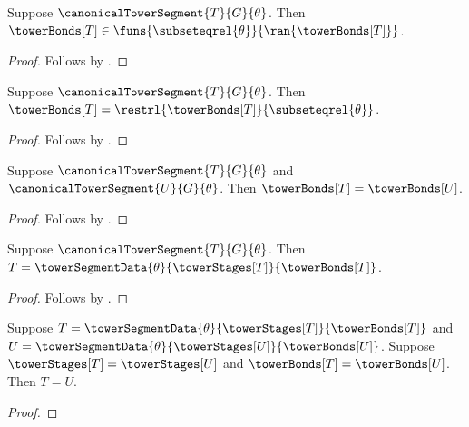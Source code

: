 \begin{proposition}\label{canonical_tower_bond_family_type}
    Suppose $\canonicalTowerSegment{T}{G}{\theta}$.
    Then $\towerBonds[T]\in
        \funs{\subseteqrel{\theta}}{\ran{\towerBonds[T]}}$.
\end{proposition}
\begin{proof}
    Follows by
        .
\end{proof}

\begin{proposition}\label{canonical_tower_bond_full_restriction}
    Suppose $\canonicalTowerSegment{T}{G}{\theta}$.
    Then $\towerBonds[T]=
        \restrl{\towerBonds[T]}{\subseteqrel{\theta}}$.
\end{proposition}
\begin{proof}
    Follows by
        .
\end{proof}

\begin{theorem}\label{canonical_tower_bond_families_equal}
    Suppose $\canonicalTowerSegment{T}{G}{\theta}$ and
        $\canonicalTowerSegment{U}{G}{\theta}$.
    Then $\towerBonds[T]=\towerBonds[U]$.
\end{theorem}
\begin{proof}
    Follows by
        .
\end{proof}

\begin{proposition}\label{canonical_tower_segment_constructor_identity}
    Suppose $\canonicalTowerSegment{T}{G}{\theta}$.
    Then $T=\towerSegmentData{\theta}
        {\towerStages[T]}{\towerBonds[T]}$.
\end{proposition}
\begin{proof}
    Follows by
        .
\end{proof}

\begin{proposition}\label{tower_segment_equality_from_constructor}
    Suppose $T=\towerSegmentData{\theta}
        {\towerStages[T]}{\towerBonds[T]}$ and
        $U=\towerSegmentData{\theta}
            {\towerStages[U]}{\towerBonds[U]}$.
    Suppose $\towerStages[T]=\towerStages[U]$ and
        $\towerBonds[T]=\towerBonds[U]$.
    Then $T=U$.
\end{proposition}
\begin{proof}
\end{proof}

